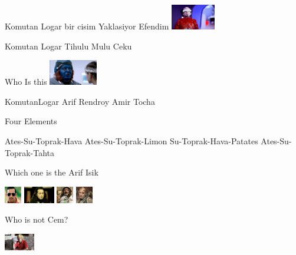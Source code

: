 \documentclass{exam}
\begin{document}
\begin{questions}
\question Komutan Logar bir cisim Yaklasiyor Efendim\newline
\includegraphics[height=3em]{tihulu.jpeg} \newline
\begin{oneparchoices}
\choice Komutan Logar
\choice Tihulu
\choice Mulu
\choice Ceku
\end{oneparchoices}
\question Who Is this\newline
\includegraphics[height=3em]{rendroy2.jpg} \newline
\begin{oneparchoices}
\choice KomutanLogar
\choice Arif
\choice Rendroy
\choice Amir Tocha
\end{oneparchoices}
\question Four Elements\newline
\begin{oneparchoices}
\choice Ates-Su-Toprak-Hava
\choice Ates-Su-Toprak-Limon
\choice Su-Toprak-Hava-Patates
\choice Ates-Su-Toprak-Tahta
\end{oneparchoices}
\question Which one is the Arif Isik\newline
\begin{oneparchoices}
\choice \includegraphics[height=2em]{arifisik.jpg}
\choice \includegraphics[height=2em]{komutanlogar.jpeg}
\choice \includegraphics[height=2em]{faruk.jpg}
\choice \includegraphics[height=2em]{216.jpg}
\end{oneparchoices}
\question Who is not Cem?\newline
\begin{oneparchoices}
\choice \includegraphics[height=2em]{ersan.jpg}

\end{oneparchoices}
\end{questions}
\end{document}
